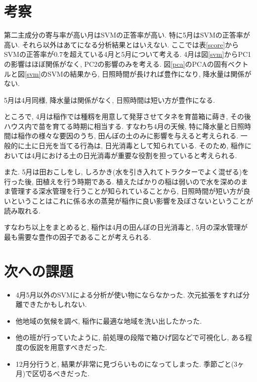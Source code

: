 \documentclass{jarticle}
\begin{document}
\hypertarget{header-n2056}{%
\section{考察}\label{header-n2056}}

第二主成分の寄与率が高い月はSVMの正答率が高い. 特に5月はSVMの正答率が高い. それら以外はあてになる分析結果とはいえない. ここでは表\ref{score}からSVMの正答率が$0.7$を超えている4月と5月について考える. 
4月は図\ref{svm}からPC1の影響はほぼ関係がなく, PC2の影響のみを考える. 図\ref{pca}のPCAの固有ベクトルと図\ref{svm}のSVMの結果から, 日照時間が長ければ豊作になり, 降水量は関係がない.

5月は4月同様, 降水量は関係がなく, 日照時間は短い方が豊作になる.

ところで, 4月は稲作では種籾を用意して発芽させてタネを育苗箱に蒔き, その後ハウス内で苗を育てる時期に相当する. すなわち4月の天候, 特に降水量と日照時間は稲作の様々な要因のうち, 田んぼの土のみに影響を与えると考えられる. 一般的に土に日光を当てる行為は, 日光消毒として知られている. そのため, 稲作においては4月における土の日光消毒が重要な役割を担っていると考えられる.

また. 5月は田おこしをし, しろかき(水を引き入れてトラクターでよく混ぜる)を行った後, 田植えを行う時期である. 植えたばかりの稲は弱いので水を深めのまま管理する深水管理を行うことが知られていることから, 日照時間が短い方が良いということはこれに係る水の蒸発が稲作に良い影響を及ぼさないということが読み取れる.

すなわち以上をまとめると, 稲作は4月の田んぼの日光消毒と, 5月の深水管理が最も需要な豊作の因子であることが考えられる.


\section{次への課題}
\begin{itemize}
\item 4月5月以外のSVMによる分析が使い物にならなかった. 次元拡張をすれば分離できたかもしれない. 
\item 他地域の気候を調べ, 稲作に最適な地域を洗い出したかった.
\item 他の班が行っていたように, 前処理の段階で箱ひげ図などで可視化し, ある程度の仮説を用意すべきだった.
\item 12月分行うと, 結果が非常に見づらいものになってしまった. 季節ごと(3ヶ月)で区切るべきだった.
\end{itemize}
\end{document}
